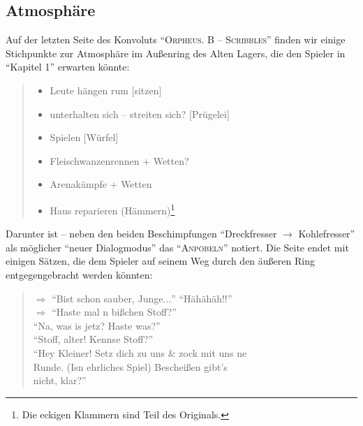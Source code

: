 \documentclass[a5paper,pagesize,numbers=noenddot]{scrbook}
\begin{document}
\subsection{Atmosphäre}\label{sec:orpheus_welt_atmosphaere}
Auf der letzten Seite des Konvoluts \enquote{\textsc{Orpheus. B -- Scribbles}} finden wir einige Stichpunkte zur Atmosphäre im Außenring des Alten Lagers, die den Spieler in \enquote{Kapitel 1} erwarten könnte:

\begin{quote}
   \begin{itemize}
      \item[--] Leute hängen rum [sitzen]
      \item[--] unterhalten sich -- streiten sich? [Prügelei]
      \item[--] Spielen [Würfel]
      \item[--] Fleischwanzenrennen + Wetten?
      \item[--] Arenakämpfe + Wetten
      \item[--] Haus reparieren (Hämmern)\footnote{Die eckigen Klammern sind Teil des Originals.}
   \end{itemize}
\end{quote}

Darunter ist -- neben den beiden Beschimpfungen \enquote{Dreckfresser $\rightarrow$ Kohlefresser} als möglicher \enquote{neuer Dialogmodus} das \enquote{\textsc{Anpöbeln}} notiert.
Die Seite endet mit einigen Sätzen, die dem Spieler auf seinem Weg durch den äußeren Ring entgegengebracht werden könnten:

\begin{quote}
   $\Rightarrow$ \enquote{Bist schon sauber, Junge$\ldots$} \enquote{Hähähäh!!}\\
   \phantom{$\Rightarrow$} $\Rightarrow$ \enquote{Haste mal n bißchen Stoff?}\\
   \phantom{$\Rightarrow$ $\Rightarrow$} \enquote{Na, was is jetz? Haste was?}\\
   \phantom{$\Rightarrow$ $\Rightarrow$} \enquote{Stoff, alter! Kennse Stoff?}\\
   \phantom{$\Rightarrow$} \enquote{Hey Kleiner! Setz dich zu uns \& zock mit uns ne\\
   \phantom{$\Rightarrow$ \guillemotleft Hey Kleiner} Runde. (Isn ehrliches Spiel) Bescheißen gibt's\\
   \phantom{$\Rightarrow$ \guillemotleft Hey Kleiner Runde. (Isn ehrliches Spiel)} nicht, klar?}
\end{quote}
\end{document}
